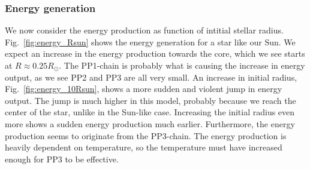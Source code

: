 \documentclass[a4paper, 11pt, english]{article}
\newcommand{\refig}[1]{\textcolor{blue}{\ref{fig:#1}}} %
\begin{document}
\subsubsection{Energy generation}
We now consider the energy production as function of intitial stellar radius.
Fig.~\refig{energy_Rsun} shows the energy generation for a star like our Sun. We expect
an increase in the energy production towards the core, which we see starts at $R \approx
0.25R_{\odot}$. The PP1-chain is probably what is causing the increase in energy output,
as we see PP2 and PP3 are all very small. An increase in initial radius,
Fig.~\refig{energy_10Rsun}, shows a more sudden and violent jump in energy output. The jump
is much higher in this model, probably because we reach the center of the star, unlike in
the Sun-like case. Increasing the initial radius even more shows a sudden energy
production much earlier. Furthermore, the energy production seems to originate from the
PP3-chain. The energy production is heavily dependent on temperature, so the temperature
must have increased enough for PP3 to be effective.
\end{document}
